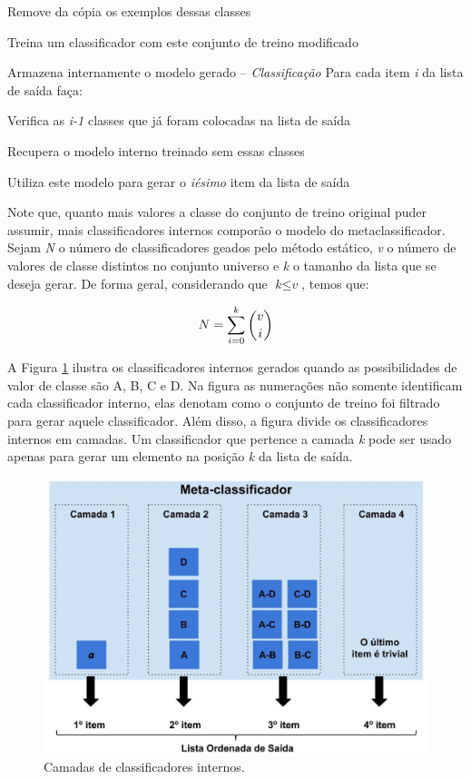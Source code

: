 \quad Remove da cópia os exemplos dessas classes

\quad Treina um classificador com este conjunto de treino modificado

\quad Armazena internamente o modelo gerado\newline
-- \textit{Classificação}\newline
Para cada item \textit{i} da lista de saída faça:

\quad Verifica as \textit{i-1} classes que já foram colocadas na lista de saída

\quad Recupera o modelo interno treinado sem essas classes

\quad Utiliza este modelo para gerar o \textit{iésimo} item da lista de saída

\hline
\hfill \break

Note que, quanto mais valores a classe do conjunto de treino original puder assumir, mais classificadores internos comporão o modelo do metaclassificador.
Sejam \textit{N} o número de classificadores geados pelo método estático, \textit{v} o número de valores de classe distintos no conjunto universo e \textit{k} o tamanho da lista que se deseja gerar. 
De forma geral, considerando que $\textit{k} \leq \textit{v}$, temos que:

\begin{equation*}

\centering
\textit{N} = \sum\limits_{i=0}^k \binom{v}{i}

\end{equation*}

A Figura \ref{fig:metodoproposto03} ilustra os classificadores internos gerados quando as possibilidades de valor de classe são A, B, C e D. Na figura as numerações não somente identificam cada classificador interno, elas denotam como o conjunto de treino foi filtrado para gerar aquele classificador. Além disso, a figura divide os classificadores internos em camadas. Um classificador que pertence a camada \textit{k} pode ser usado apenas para gerar um elemento na posição \textit{k} da lista de saída.

\begin{figure}[h!]
  \includegraphics[width=\linewidth]{images/metodoproposto03.eps}
  \caption{Camadas de classificadores internos.}
  \label{fig:metodoproposto03}
\end{figure}

